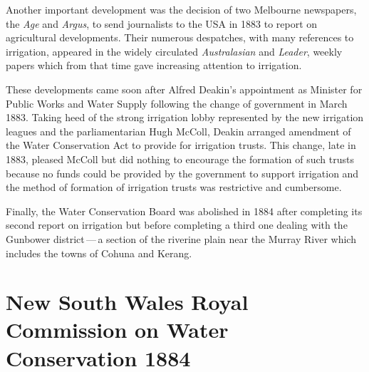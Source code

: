 Another important development was the decision of two Melbourne
newspapers, the \textsl{Age} and \textsl{Argus}, to send journalists
to the USA  in 1883 to report on agricultural developments.
Their numerous despatches, with many references to irrigation,
appeared in the widely circulated \textsl{Australasian} and
\textsl{Leader}, weekly papers which from that time gave increasing
attention to irrigation.

These developments came soon after Alfred Deakin's 
appointment as Minister for Public Works and Water Supply following
the change of government in March 1883.  Taking heed of the strong
irrigation lobby represented by the new irrigation leagues and the
parliamentarian Hugh McColl,  Deakin arranged
amendment of the Water Conservation Act to provide for irrigation
trusts.  This change, late in 1883, pleased McColl but did nothing to
encourage the formation of such trusts because no funds could be
provided by the government to support irrigation and the method of
formation of irrigation trusts was restrictive and
cumbersome.

Finally, the Water Conservation Board was abolished in 1884 after
completing its second report on irrigation but before completing a
third one dealing with the Gunbower district\,---\,a section of the
riverine plain near the Murray River  which
includes the towns of Cohuna  and 
Kerang.

\section*{New South Wales Royal Commission on Water Conservation 1884}

